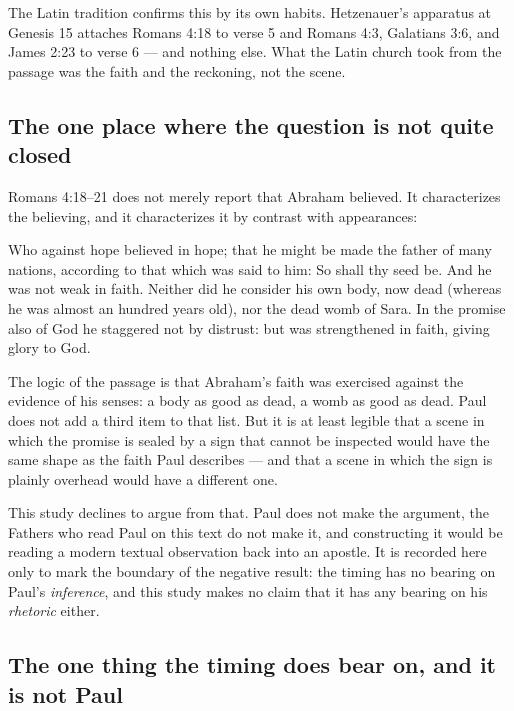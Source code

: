 The Latin tradition confirms this by its own habits. Hetzenauer's apparatus at
Genesis 15 attaches Romans 4:18 to verse 5 and Romans 4:3, Galatians 3:6, and
James 2:23 to verse 6 --- and nothing else. What the Latin church took from the
passage was the faith and the reckoning, not the scene.

\subsection{The one place where the question is not quite closed}

Romans 4:18--21 does not merely report that Abraham believed. It characterizes
the believing, and it characterizes it by contrast with appearances:

\begin{studyframe}
Who against hope believed in hope; that he might be made the father of many
nations, according to that which was said to him: So shall thy seed be. And he
was not weak in faith. Neither did he consider his own body, now dead (whereas he
was almost an hundred years old), nor the dead womb of Sara. In the promise also
of God he staggered not by distrust: but was strengthened in faith, giving glory
to God.
\end{studyframe}

The logic of the passage is that Abraham's faith was exercised against the
evidence of his senses: a body as good as dead, a womb as good as dead. Paul
does not add a third item to that list. But it is at least legible that a scene
in which the promise is sealed by a sign that cannot be inspected would have the
same shape as the faith Paul describes --- and that a scene in which the sign is
plainly overhead would have a different one.

This study declines to argue from that. Paul does not make the argument, the
Fathers who read Paul on this text do not make it, and constructing it would be
reading a modern textual observation back into an apostle. It is recorded here
only to mark the boundary of the negative result: the timing has no bearing on
Paul's \emph{inference}, and this study makes no claim that it has any bearing on
his \emph{rhetoric} either.

\subsection{The one thing the timing does bear on, and it is not Paul}

